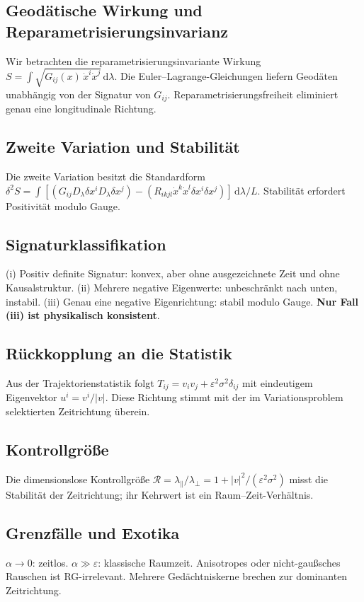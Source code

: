 \documentclass[11pt,a4paper]{article}
\begin{document}
\subsection{Geod\"atische Wirkung und Reparametrisierungsinvarianz}
Wir betrachten die reparametrisierungsinvariante Wirkung $S=\int \sqrt{G_{ij}(x)\,\dot x^i\dot x^j}\,\mathrm d\lambda$. Die Euler--Lagrange-Gleichungen liefern Geod\"aten unabh\"angig von der Signatur von $G_{ij}$. Reparametrisierungsfreiheit eliminiert genau eine longitudinale Richtung.

\subsection{Zweite Variation und Stabilit\"at}
Die zweite Variation besitzt die Standardform $\delta^2 S=\int[(G_{ij}D_\lambda\delta x^i D_\lambda\delta x^j)-(R_{ikjl}\dot x^k\dot x^l\delta x^i\delta x^j)]\,\mathrm d\lambda/L$. Stabilit\"at erfordert Positivit\"at modulo Gauge.

\subsection{Signaturklassifikation}
(i) Positiv definite Signatur: konvex, aber ohne ausgezeichnete Zeit und ohne Kausalstruktur. (ii) Mehrere negative Eigenwerte: unbeschr\"ankt nach unten, instabil. (iii) Genau eine negative Eigenrichtung: stabil modulo Gauge. \textbf{Nur Fall (iii) ist physikalisch konsistent}.

\subsection{R\"uckkopplung an die Statistik}
Aus der Trajektorienstatistik folgt $T_{ij}=v_i v_j+\varepsilon^2\sigma^2\delta_{ij}$ mit eindeutigem Eigenvektor $u^i=v^i/|v|$. Diese Richtung stimmt mit der im Variationsproblem selektierten Zeitrichtung \"uberein.

\subsection{Kontrollgr\"o\ss e}
Die dimensionslose Kontrollgr\"o\ss e $\mathcal R=\lambda_\parallel/\lambda_\perp=1+|v|^2/(\varepsilon^2\sigma^2)$ misst die Stabilit\"at der Zeitrichtung; ihr Kehrwert ist ein Raum--Zeit-Verh\"altnis.

\subsection{Grenzf\"alle und Exotika}
$\alpha\to0$: zeitlos. $\alpha\gg\varepsilon$: klassische Raumzeit. Anisotropes oder nicht-gau\ss sches Rauschen ist RG-irrelevant. Mehrere Ged\"achtniskerne brechen zur dominanten Zeitrichtung.
\end{document}
